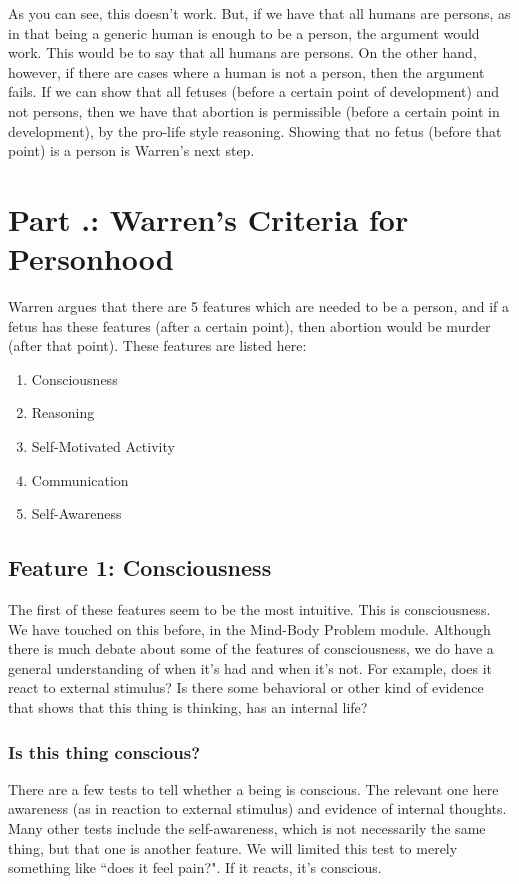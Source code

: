 As you can see, this doesn’t work. But, if we have that all humans are persons, as in that being a generic human is enough to be a person, the argument would work. This would be to say that all humans are persons. On the other hand, however, if there are cases where a human is not a person, then the argument fails. If we can show that all fetuses (before a certain point of development) and not persons, then we have that abortion is permissible (before a certain point in development), by the pro-life style reasoning. Showing that no fetus (before that point) is a person is Warren's next step.  

\section{Part \thechapcount.\theseccount: Warren's Criteria for Personhood}
Warren argues that there are 5 features which are needed to be a person, and if a fetus has these features (after a certain point), then abortion would be murder (after that point). These features are listed here:

\begin{enumerate}
\item Consciousness 	
\item Reasoning
\item Self-Motivated Activity 
\item Communication
\item Self-Awareness
\end{enumerate}

\subsection{Feature 1: Consciousness}

The first of these features seem to be the most intuitive. This is consciousness. We have touched on this before, in the Mind-Body Problem module. Although there is much debate about some of the features of consciousness, we do have a general understanding of when it's had and when it's not. For example, does it react to external stimulus? Is there some behavioral or other kind of evidence that shows that this thing is thinking, has an internal life? 

\subsubsection{Is this thing conscious?}

There are a few tests to tell whether a being is conscious. The relevant one here awareness (as in reaction to external stimulus) and evidence of internal thoughts. Many other tests include the self-awareness, which is not necessarily the same thing, but that one is another feature. We will limited this test to merely something like ``does it feel pain?". If it reacts, it's conscious.

